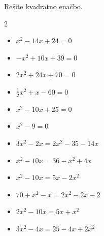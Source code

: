         \begin{naloga}
            Rešite kvadratno enačbo.
            
            \begin{multicols}{2}
                
                \begin{itemize}
                    \item $ x^2-14x+24=0 $ 
                    \item $ -x^2+10x+39=0 $ 
                    \item $ 2x^2+24x+70=0 $ 
                    \item $ \frac{1}{2}x^2+x-60=0 $ 
                    \item $ x^2-10x+25=0 $ 
                    \item $ x^2-9=0 $
   
                    \item $ 3x^2-2x=2x^2-35-14x $ 
                    \item $ x^2-10x=36-x^2+4x $ 
                    \item $ x^2-10x=5x-2x^2 $ 
                    \item $ 70+x^2-x=2x^2-2x-2 $ 
                    \item $ 2x^2-10x=5x+x^2 $ 
                    \item $ 3x^2-4x=25-4x+2x^2 $
                \end{itemize}
            \end{multicols}
        \end{naloga}
    


